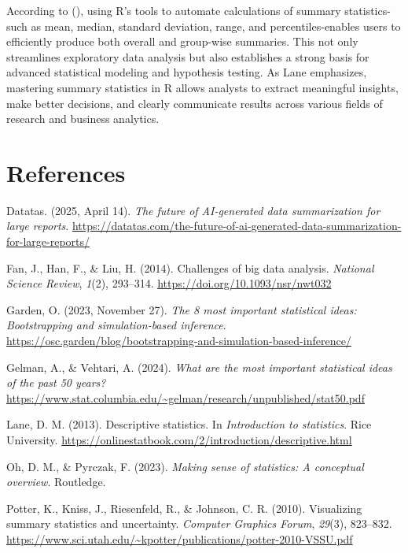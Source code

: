 \documentclass[
  man,
  floatsintext,
  longtable,
  nolmodern,
  notxfonts,
  notimes,
  colorlinks=true,linkcolor=blue,citecolor=blue,urlcolor=blue]{apa7}
\newlength{\cslhangindent}
\newenvironment{CSLReferences}[2] %
 {\begin{list}{}{%
  \setlength{\itemindent}{0pt}
  \setlength{\leftmargin}{0pt}
  \setlength{\parsep}{0pt}
  \ifodd #1
   \setlength{\leftmargin}{\cslhangindent}
   \setlength{\itemindent}{-1\cslhangindent}
  \fi
  \setlength{\itemsep}{#2\baselineskip}}}
 {\end{list}}
\begin{document}
According to (), using R's
tools to automate calculations of summary statistics-such as mean,
median, standard deviation, range, and percentiles-enables users to
efficiently produce both overall and group-wise summaries. This not only
streamlines exploratory data analysis but also establishes a strong
basis for advanced statistical modeling and hypothesis testing. As Lane
emphasizes, mastering summary statistics in R allows analysts to extract
meaningful insights, make better decisions, and clearly communicate
results across various fields of research and business analytics.

\newpage

\section{References}\label{references}

\label{refs}
\begin{CSLReferences}{1}{0}
Datatas. (2025, April 14). \emph{The future of AI-generated data
summarization for large reports}.
\url{https://datatas.com/the-future-of-ai-generated-data-summarization-for-large-reports/}

Fan, J., Han, F., \& Liu, H. (2014). Challenges of big data analysis.
\emph{National Science Review}, \emph{1}(2), 293--314.
\url{https://doi.org/10.1093/nsr/nwt032}

Garden, O. (2023, November 27). \emph{The 8 most important statistical
ideas: Bootstrapping and simulation-based inference}.
\url{https://osc.garden/blog/bootstrapping-and-simulation-based-inference/}

Gelman, A., \& Vehtari, A. (2024). \emph{What are the most important
statistical ideas of the past 50 years?}
\url{https://www.stat.columbia.edu/~gelman/research/unpublished/stat50.pdf}

Lane, D. M. (2013). Descriptive statistics. In \emph{Introduction to
statistics}. Rice University.
\url{https://onlinestatbook.com/2/introduction/descriptive.html}

Oh, D. M., \& Pyrczak, F. (2023). \emph{Making sense of statistics: A
conceptual overview}. Routledge.

Potter, K., Kniss, J., Riesenfeld, R., \& Johnson, C. R. (2010).
Visualizing summary statistics and uncertainty. \emph{Computer Graphics
Forum}, \emph{29}(3), 823--832.
\url{https://www.sci.utah.edu/~kpotter/publications/potter-2010-VSSU.pdf}

\end{CSLReferences}
\end{document}

